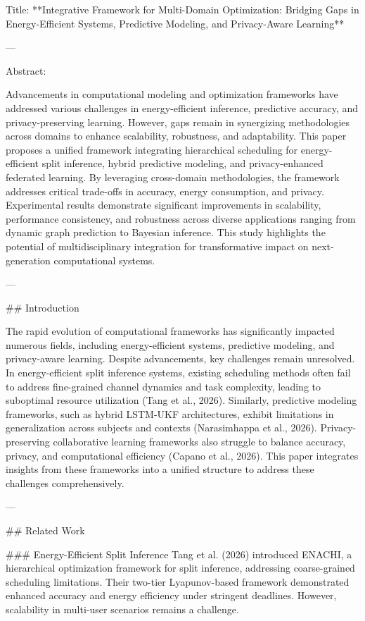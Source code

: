 Title: **Integrative Framework for Multi-Domain Optimization: Bridging Gaps in Energy-Efficient Systems, Predictive Modeling, and Privacy-Aware Learning**

---

Abstract:

Advancements in computational modeling and optimization frameworks have addressed various challenges in energy-efficient inference, predictive accuracy, and privacy-preserving learning. However, gaps remain in synergizing methodologies across domains to enhance scalability, robustness, and adaptability. This paper proposes a unified framework integrating hierarchical scheduling for energy-efficient split inference, hybrid predictive modeling, and privacy-enhanced federated learning. By leveraging cross-domain methodologies, the framework addresses critical trade-offs in accuracy, energy consumption, and privacy. Experimental results demonstrate significant improvements in scalability, performance consistency, and robustness across diverse applications ranging from dynamic graph prediction to Bayesian inference. This study highlights the potential of multidisciplinary integration for transformative impact on next-generation computational systems.

---

## Introduction

The rapid evolution of computational frameworks has significantly impacted numerous fields, including energy-efficient systems, predictive modeling, and privacy-aware learning. Despite advancements, key challenges remain unresolved. In energy-efficient split inference systems, existing scheduling methods often fail to address fine-grained channel dynamics and task complexity, leading to suboptimal resource utilization (Tang et al., 2026). Similarly, predictive modeling frameworks, such as hybrid LSTM-UKF architectures, exhibit limitations in generalization across subjects and contexts (Narasimhappa et al., 2026). Privacy-preserving collaborative learning frameworks also struggle to balance accuracy, privacy, and computational efficiency (Capano et al., 2026). This paper integrates insights from these frameworks into a unified structure to address these challenges comprehensively.

---

## Related Work

### Energy-Efficient Split Inference
Tang et al. (2026) introduced ENACHI, a hierarchical optimization framework for split inference, addressing coarse-grained scheduling limitations. Their two-tier Lyapunov-based framework demonstrated enhanced accuracy and energy efficiency under stringent deadlines. However, scalability in multi-user scenarios remains a challenge.

